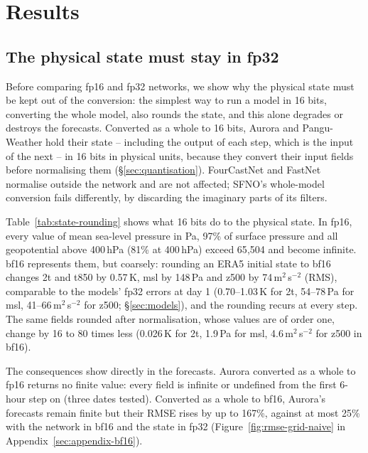 \section{Results}
\label{sec:results}

\subsection{The physical state must stay in fp32}
\label{sec:results-state}

Before comparing fp16 and fp32 networks, we show why the
physical state must be kept out of the conversion: the simplest way to
run a model in 16 bits, converting the whole model, also rounds the
state, and this alone degrades or destroys the forecasts. Converted as a
whole to 16 bits, Aurora and Pangu-Weather hold
their state -- including the output of each step, which is the input of
the next -- in 16 bits in physical units, because they convert their
input fields before normalising them (\S\ref{sec:quantisation}).
FourCastNet and FastNet normalise outside the network and
are not affected; SFNO's whole-model conversion fails differently, by
discarding the imaginary parts of its filters.



Table~\ref{tab:state-rounding} shows what 16 bits do to the
physical state. In fp16, every value of mean sea-level pressure in Pa, 97\%
of surface pressure and all geopotential above 400\,hPa (81\% at 400\,hPa)
exceed 65{,}504 and become infinite. bf16 represents them, but coarsely:
rounding an ERA5 initial state to bf16 changes 2t and t850 by 0.57\,K, msl
by 148\,Pa and z500 by 74\,m$^2$\,s$^{-2}$ (RMS), comparable to the models'
fp32 errors at day 1 (0.70--1.03\,K for 2t, 54--78\,Pa for msl,
41--66\,m$^2$\,s$^{-2}$ for z500; \S\ref{sec:models}), and the rounding
recurs at every step. The same fields rounded after normalisation, whose
values are of order one, change by 16 to 80 times less (0.026\,K for 2t,
1.9\,Pa for msl, 4.6\,m$^2$\,s$^{-2}$ for z500 in bf16).

The consequences show directly in the forecasts. Aurora
converted as a whole to fp16 returns no finite value: every field is
infinite or undefined from the first 6-hour step on (three dates tested).
Converted as a whole to bf16, Aurora's forecasts remain finite but
their RMSE rises by up to 167\%, against at most 25\% with the network in
bf16 and the state in fp32 (Figure~\ref{fig:rmse-grid-naive} in
Appendix~\ref{sec:appendix-bf16}).

